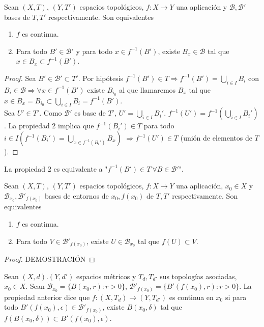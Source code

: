 \begin{properties}
    Sean $(X,T)$, $(Y,T')$ espacios topológicos, $f: X \to Y$ una aplicación y $\mathcal{B},\mathcal{B}'$ bases de $T,T'$ respectivamente. Son equivalentes
    \begin{enumerate}
        \item $f$ es continua.
        \item Para todo $B' \in \mathcal{B}'$ y para todo $x \in f^{-1}(B')$, existe $B_x \in \mathcal{B}$ tal que $x \in B_x \subset f^{-1}(B')$.
    \end{enumerate}
\end{properties}
\begin{proof}
   Sea $B' \in \mathcal{B}' \subset T'$. Por hipótesis $f^{-1}(B') \in T \Rightarrow f^{-1}(B') = \bigcup_{i \in I} B_i$ con $B_i \in \mathcal{B} \Rightarrow \forall x \in f^{-1}(B')$ existe $B_{i_0}$ al que llamaremos $B_x$ tal que $x \in B_x = B_{i_0} \subset \bigcup_{i \in I} B_i = f^{-1}(B')$. \\
   Sea $U' \in T'$. Como $\mathcal{B}'$ es base de $T'$, $U' = \bigcup_{i \in I} B_i'$. $f^{-1}(U') = f^{-1}\left( \bigcup_{i \in I} B_i' \right)$. La propiedad 2 implica que $f^{-1}(B_i') \in T$ para todo $i \in I \left( f^{-1}(B_i') = \bigcup_{x \in f^{-1}(B_i')} B_x \right)$ $\Rightarrow f^{-1}(U') \in T$ (unión de elementos de $T$).
\end{proof}
\begin{note}
	La propiedad 2 es equivalente a "$f^{-1}(B') \in T \ \forall B \in \mathcal{B}'$".
\end{note}
\begin{properties}
    Sean $(X,T)$, $(Y,T')$ espacios topológicos, $f: X \to Y$ una aplicación, $x_0 \in X$ y $\mathcal{B}_{x_0},\mathcal{B}'_{f(x_0)}$ bases de entornos de $x_0, f(x_0)$ de $T,T'$ respectivamente. Son equivalentes
    \begin{enumerate}
        \item $f$ es continua.
        \item Para todo $V \in \mathcal{B}'_{f(x_0)}$, existe $U \in \mathcal{B}_{x_0}$ tal que $f(U) \subset V$.
    \end{enumerate}
\end{properties}
\begin{proof}
	DEMOSTRACIÓN
\end{proof}
\begin{exmp}
  Sean $(X,d). (Y,d')$ espacios métricos y $T_d, T_{d'}$ sus topologías asociadas, $x_0 \in X$. Sean $\mathcal{B}_{x_0} = \{B(x_0,r):r>0\}$, $\mathcal{B}'_{f(x_0)} = \{B'(f(x_0),r):r>0\}$. La propiedad anterior dice que $f:(X,T_d) \to (Y,T_{d'})$ es continua en $x_0$ si para todo $B'(f(x_0),\epsilon) \in \mathcal{B}'_{f(x_0)}$, existe $B(x_0,\delta)$ tal que $f(B(x_0,\delta)) \subset B'(f(x_0),\epsilon)$.
\end{exmp}
